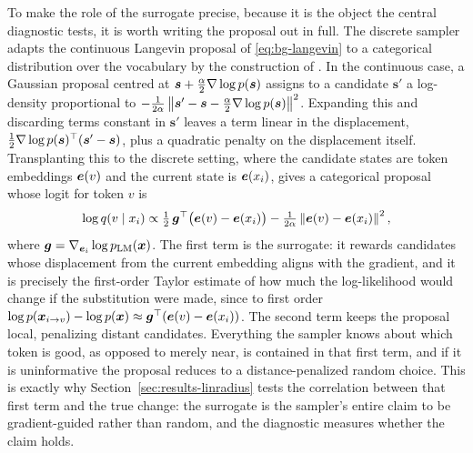 To make the role of the surrogate precise, because it is the object the central diagnostic tests, it is worth writing the proposal out in full. The discrete sampler adapts the continuous Langevin proposal of \eqref{eq:bg-langevin} to a categorical distribution over the vocabulary by the construction of \citet{zhang2022langevin}. In the continuous case, a Gaussian proposal centred at $\bm{s} + \tfrac{\alpha}{2}\nabla\log p(\bm{s})$ assigns to a candidate $\bm{s}'$ a log-density proportional to $-\tfrac{1}{2\alpha}\left\lVert\bm{s}' - \bm{s} - \tfrac{\alpha}{2}\nabla\log p(\bm{s})\right\rVert^2$. Expanding this and discarding terms constant in $\bm{s}'$ leaves a term linear in the displacement, $\tfrac{1}{2}\nabla\log p(\bm{s})^\top(\bm{s}' - \bm{s})$, plus a quadratic penalty on the displacement itself. Transplanting this to the discrete setting, where the candidate states are token embeddings $\bm{e}(v)$ and the current state is $\bm{e}(x_i)$, gives a categorical proposal whose logit for token $v$ is
\begin{equation}
    \log q(v \mid x_i) \propto \tfrac{1}{2}\,\bm{g}^\top\bigl(\bm{e}(v) - \bm{e}(x_i)\bigr) - \tfrac{1}{2\alpha}\left\lVert\bm{e}(v) - \bm{e}(x_i)\right\rVert^2,
    \label{eq:bg-discrete-proposal}
\end{equation}
where $\bm{g} = \nabla_{\bm{e}_i}\log p_{\text{LM}}(\bm{x})$. The first term is the surrogate: it rewards candidates whose displacement from the current embedding aligns with the gradient, and it is precisely the first-order Taylor estimate of how much the log-likelihood would change if the substitution were made, since to first order $\log p(\bm{x}_{i \to v}) - \log p(\bm{x}) \approx \bm{g}^\top(\bm{e}(v) - \bm{e}(x_i))$. The second term keeps the proposal local, penalizing distant candidates. Everything the sampler knows about which token is good, as opposed to merely near, is contained in that first term, and if it is uninformative the proposal reduces to a distance-penalized random choice. This is exactly why Section~\ref{sec:results-linradius} tests the correlation between that first term and the true change: the surrogate is the sampler's entire claim to be gradient-guided rather than random, and the diagnostic measures whether the claim holds.

